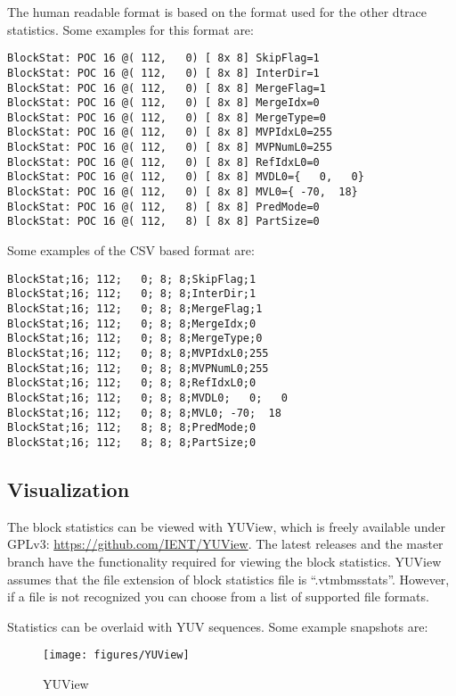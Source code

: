 \documentclass[a4paper,11pt]{jvetdoc}
\begin{document}
The human readable format is based on the format used for the other dtrace
statistics. Some examples for this format are:
\begin{verbatim}
BlockStat: POC 16 @( 112,   0) [ 8x 8] SkipFlag=1
BlockStat: POC 16 @( 112,   0) [ 8x 8] InterDir=1
BlockStat: POC 16 @( 112,   0) [ 8x 8] MergeFlag=1
BlockStat: POC 16 @( 112,   0) [ 8x 8] MergeIdx=0
BlockStat: POC 16 @( 112,   0) [ 8x 8] MergeType=0
BlockStat: POC 16 @( 112,   0) [ 8x 8] MVPIdxL0=255
BlockStat: POC 16 @( 112,   0) [ 8x 8] MVPNumL0=255
BlockStat: POC 16 @( 112,   0) [ 8x 8] RefIdxL0=0
BlockStat: POC 16 @( 112,   0) [ 8x 8] MVDL0={   0,   0}
BlockStat: POC 16 @( 112,   0) [ 8x 8] MVL0={ -70,  18}
BlockStat: POC 16 @( 112,   8) [ 8x 8] PredMode=0
BlockStat: POC 16 @( 112,   8) [ 8x 8] PartSize=0
\end{verbatim}

Some examples of the CSV based format are:
\begin{verbatim}
BlockStat;16; 112;   0; 8; 8;SkipFlag;1
BlockStat;16; 112;   0; 8; 8;InterDir;1
BlockStat;16; 112;   0; 8; 8;MergeFlag;1
BlockStat;16; 112;   0; 8; 8;MergeIdx;0
BlockStat;16; 112;   0; 8; 8;MergeType;0
BlockStat;16; 112;   0; 8; 8;MVPIdxL0;255
BlockStat;16; 112;   0; 8; 8;MVPNumL0;255
BlockStat;16; 112;   0; 8; 8;RefIdxL0;0
BlockStat;16; 112;   0; 8; 8;MVDL0;   0;   0
BlockStat;16; 112;   0; 8; 8;MVL0; -70;  18
BlockStat;16; 112;   8; 8; 8;PredMode;0
BlockStat;16; 112;   8; 8; 8;PartSize;0
\end{verbatim}

\subsection{Visualization}
\label{sec:visualization}

The block statistics can be viewed with YUView, which is freely available under
GPLv3: \url{https://github.com/IENT/YUView}. The latest releases and the master
branch have the functionality required for  viewing the block statistics. YUView
assumes that the file extension of block statistics file is
“.vtmbmsstats”. However, if a file is not recognized you can choose from a list
of supported file formats.


Statistics can be overlaid with YUV sequences. Some example snapshots are:

\begin{figure}[htpb]
  \centering
  \texttt{[image: figures/YUView]}
  \caption{YUView}
  \label{fig:yuview}
\end{figure}
\end{document}
